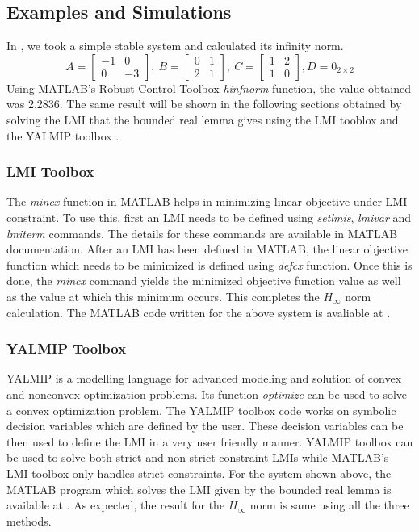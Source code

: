 \documentclass[a4paper,12pt]{article}
\begin{document}
	\subsection{Examples and Simulations}
	In \cite{prev}, we took a simple stable system and calculated its infinity norm.
		\[A=\begin{bmatrix}
		-1 & 0 \\
		0 & -3
		\end{bmatrix}
		,\:B=\begin{bmatrix}
		0 & 1 \\
		2 & 1
		\end{bmatrix}
		,\:C=\begin{bmatrix}
		1 & 2 \\ 1 & 0
		\end{bmatrix}
		, D= 0_{2 \times 2}
		\]
		Using MATLAB's Robust Control Toolbox \textit{hinfnorm} function, the value obtained was 2.2836. The same result will be shown in the following sections obtained by solving the LMI that the bounded real lemma gives using the LMI tooblox and the YALMIP toolbox \cite{yalmip}. 
		\subsubsection{LMI Toolbox} The \textit{mincx} function in MATLAB helps in minimizing linear objective under LMI constraint. To use this, first an LMI needs to be defined using \textit{setlmis}, \textit{lmivar} and \textit{lmiterm} commands. The details for these commands are available in MATLAB documentation. After an LMI has been defined in MATLAB, the linear objective function which needs to be minimized is defined using \textit{defcx} function. Once this is done, the \textit{mincx} command yields the minimized objective function value as well as the value at which this minimum occurs. This completes the $H_{\infty}$ norm calculation. The MATLAB code written for the above system is avaliable at \cite{git}. 
		\subsubsection{YALMIP Toolbox}
		YALMIP is a modelling language for advanced modeling and solution of convex and nonconvex optimization problems. Its function \textit{optimize} can be used to solve a convex optimization problem. The YALMIP toolbox code works on symbolic decision variables which are defined by the user. These decision variables can be then used to define the LMI in a very user friendly manner. YALMIP toolbox can be used to solve both strict and non-strict constraint LMIs while MATLAB's LMI toolbox only handles strict constraints. For the system shown above, the MATLAB program which solves the LMI given by the bounded real lemma is available at \cite{git}. As expected, the result for the $H_{\infty}$ norm is same using all the three methods.
\end{document}
